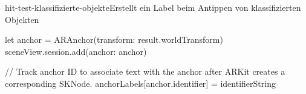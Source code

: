 \begin{description}
\begin{code}{hit-test-klassifizierte-objekte}{Erstellt ein Label beim Antippen von klassifizierten Objekten}
{{			let anchor = ARAnchor(transform: result.worldTransform)
			sceneView.session.add(anchor: anchor)
			
			// Track anchor ID to associate text with the anchor after ARKit creates a corresponding SKNode.
			anchorLabels[anchor.identifier] = identifierString
		}
	}
	\end{code}

\end{description}
